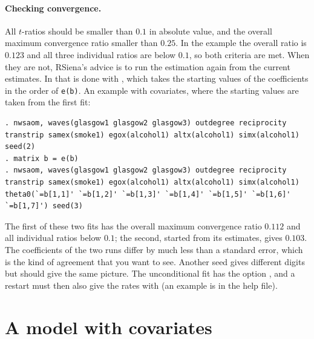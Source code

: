 \paragraph{Checking convergence.} All $t$-ratios should be smaller than $0.1$ in absolute value, and the overall maximum convergence ratio smaller than $0.25$. In the example the overall ratio is $0.123$ and all three individual ratios are below $0.1$, so both criteria are met. When they are not, RSiena's advice is to run the estimation again from the current estimates. In \nwsaom{} that is done with , which takes the starting values of the coefficients in the order of \texttt{e(b)}. An example with covariates, where the starting values are taken from the first fit:
\begin{lstlisting}
. nwsaom, waves(glasgow1 glasgow2 glasgow3) outdegree reciprocity transtrip samex(smoke1) egox(alcohol1) altx(alcohol1) simx(alcohol1) seed(2)
. matrix b = e(b)
. nwsaom, waves(glasgow1 glasgow2 glasgow3) outdegree reciprocity transtrip samex(smoke1) egox(alcohol1) altx(alcohol1) simx(alcohol1) theta0(`=b[1,1]' `=b[1,2]' `=b[1,3]' `=b[1,4]' `=b[1,5]' `=b[1,6]' `=b[1,7]') seed(3)
\end{lstlisting}
The first of these two fits has the overall maximum convergence ratio $0.112$ and all individual ratios below $0.1$; the second, started from its estimates, gives $0.103$. The coefficients of the two runs differ by much less than a standard error, which is the kind of agreement that you want to see. Another seed gives different digits but should give the same picture. The unconditional fit has the option , and a restart must then also give the rates with  (an example is in the help file).

\section{A model with covariates}

